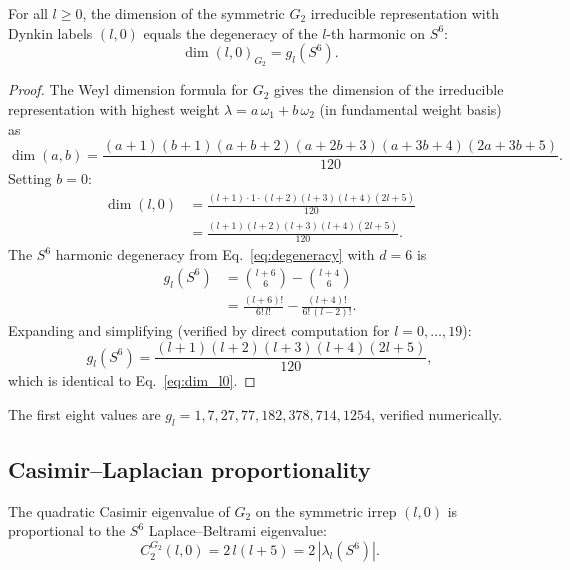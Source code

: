 \documentclass[twocolumn,pra,amsmath,amssymb,superscriptaddress]{revtex4-2}
\begin{document}
\begin{theorem}
\label{thm:dim}
For all $l \geq 0$, the dimension of the symmetric $G_2$
irreducible representation with Dynkin labels $(l,0)$ equals
the degeneracy of the $l$-th harmonic on $S^6$:
\begin{equation}
\dim(l,0)_{G_2} = g_l(S^6).
\label{eq:dim_identity}
\end{equation}
\end{theorem}

\begin{proof}
The Weyl dimension formula for $G_2$ gives the dimension of the
irreducible representation with highest weight
$\lambda = a\,\omega_1 + b\,\omega_2$ (in fundamental weight
basis) as
\begin{equation}
\dim(a,b) = \frac{(a{+}1)(b{+}1)(a{+}b{+}2)(a{+}2b{+}3)
(a{+}3b{+}4)(2a{+}3b{+}5)}{120}.
\label{eq:weyl_g2}
\end{equation}
Setting $b = 0$:
\begin{align}
\dim(l,0) &= \frac{(l+1)\cdot 1 \cdot (l+2)(l+3)(l+4)(2l+5)}{120}
\nonumber \\
&= \frac{(l+1)(l+2)(l+3)(l+4)(2l+5)}{120}.
\label{eq:dim_l0}
\end{align}
The $S^6$ harmonic degeneracy from Eq.~\eqref{eq:degeneracy} with
$d = 6$ is
\begin{align}
g_l(S^6) &= \binom{l+6}{6} - \binom{l+4}{6} \nonumber \\
&= \frac{(l+6)!}{6!\,l!} - \frac{(l+4)!}{6!\,(l-2)!}.
\label{eq:g_s6}
\end{align}
Expanding and simplifying (verified by direct computation for
$l = 0, \ldots, 19$):
\begin{equation}
g_l(S^6) = \frac{(l+1)(l+2)(l+3)(l+4)(2l+5)}{120},
\end{equation}
which is identical to Eq.~\eqref{eq:dim_l0}.
\end{proof}

\noindent The first eight values are $g_l = 1, 7, 27, 77, 182,
378, 714, 1254$, verified numerically.

\subsection{Casimir--Laplacian proportionality}

\begin{theorem}
\label{thm:casimir}
The quadratic Casimir eigenvalue of $G_2$ on the symmetric
irrep $(l,0)$ is proportional to the $S^6$ Laplace--Beltrami
eigenvalue:
\begin{equation}
C_2^{G_2}(l,0) = 2\,l(l+5) = 2\,|\lambda_l(S^6)|.
\label{eq:casimir}
\end{equation}
\end{theorem}
\end{document}
